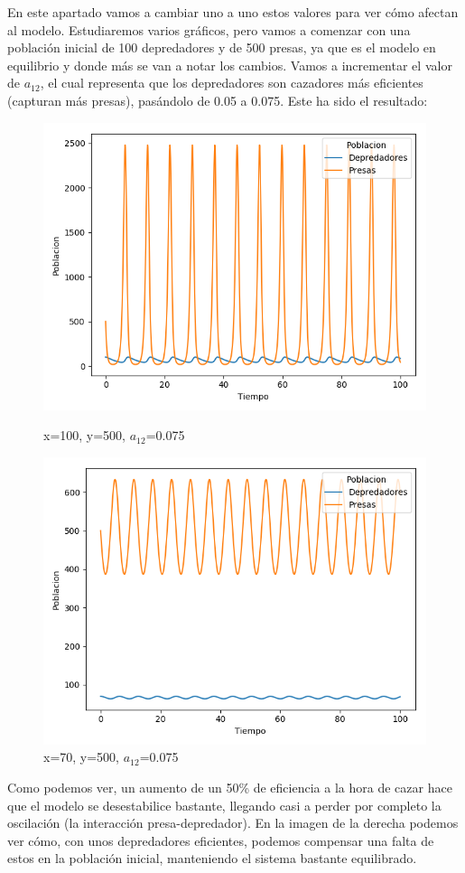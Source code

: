 \documentclass[11pt,a4paper]{article}
\begin{document}
En este apartado vamos a cambiar uno a uno estos valores para ver cómo afectan al modelo. Estudiaremos varios gráficos, pero vamos a comenzar
con una población inicial de 100 depredadores y de 500 presas, ya que es el modelo en equilibrio y donde más se van a notar los cambios. Vamos
a incrementar el valor de $a_{12}$, el cual representa que los depredadores son cazadores más eficientes (capturan más presas), pasándolo de
0.05 a 0.075. Este ha sido el resultado:
\begin{figure}[H]
	\centering
	\begin{minipage}{0.5\textwidth}
		\centering
		\includegraphics[scale=0.4]{img/4-a12-100-500.png}
		\caption{x=100, y=500, $a_{12}$=0.075}
	\end{minipage}%
	\begin{minipage}{0.5\textwidth}
		\centering
		\includegraphics[scale=0.4]{img/4-a12-70-500.png}
		\caption{x=70, y=500, $a_{12}$=0.075}
	\end{minipage}
\end{figure}

Como podemos ver, un aumento de un 50\% de eficiencia a la hora de cazar hace que el modelo se desestabilice bastante, llegando casi a perder
por completo la oscilación (la interacción presa-depredador). En la imagen de la derecha podemos ver cómo, con unos depredadores eficientes,
podemos compensar una falta de estos en la población inicial, manteniendo el sistema bastante equilibrado.
\end{document}
